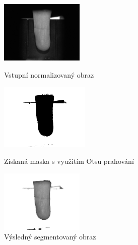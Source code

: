 \begin{figure}[!htbp]
  \begin{minipage}[b]{0.3\linewidth}
    \centering
    \includegraphics[width=150px]{obrazky-figures/live104norm.png}
    \caption{Vstupní normalizovaný obraz}
  \end{minipage}
  \hspace{0.55cm}
  \begin{minipage}[b]{0.3\linewidth}
    \centering
    \includegraphics[width=160px]{obrazky-figures/live104mask.png}
    \caption{Získaná maska s využitím Otsu prahování}
  \end{minipage}
  \hspace{0.3cm}
    \begin{minipage}[b]{0.3\linewidth}
    \centering
    \includegraphics[width=150px]{obrazky-figures/live104segotsu.png}
    \caption{Výsledný segmentovaný obraz}
  \end{minipage}
\end{figure}


